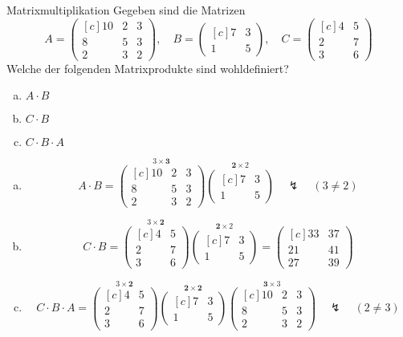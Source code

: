 \documentclass[german]{../spicker}
\newcommand{\vektor}[1]{\begin{pmatrix*}[c] #1 \end{pmatrix*}}
\begin{document}
\begin{example}{Matrixmultiplikation}
    Gegeben sind die Matrizen
    $$
        A = \vektor{10 & 2 & 3 \\ 8 & 5 & 3 \\ 2 & 3 & 2}, \quad
        B = \vektor{7 & 3 \\ 1 & 5}, \quad
        C = \vektor{4 & 5 \\ 2 & 7 \\ 3 & 6}
    $$
    Welche der folgenden Matrixprodukte sind wohldefiniert?

    \begin{enumerate}[a)]
        \item $A\cdot B$
        \item $C\cdot B$
        \item $C\cdot B \cdot A$
    \end{enumerate}

    \exampleseparator

    \begin{enumerate}[a)]
        \item $$
                  A\cdot B = \overset{3\times \pmb{3}}{\vektor{10 & 2 & 3 \\ 8 & 5 & 3 \\ 2 & 3 & 2}} \overset{\pmb{2}\times 2}{\vektor{7 & 3 \\ 1 & 5}} \quad \lightning \quad (3 \neq 2)
              $$
        \item $$
                  C\cdot B = \overset{3\times \pmb{2}}{\vektor{4 & 5 \\ 2 & 7 \\ 3 & 6}} \overset{\pmb{2}\times 2}{\vektor{7 & 3 \\ 1 & 5}} = \vektor{33 & 37 \\ 21 & 41 \\ 27 & 39}
              $$
        \item $$
                  C\cdot B \cdot A = \overset{3\times \pmb{2}}{\vektor{4 & 5 \\ 2 & 7 \\ 3 & 6}} \overset{\pmb{2}\times \pmb{2}}{\vektor{7 & 3 \\ 1 & 5}} \overset{\pmb{3}\times 3}{\vektor{10 & 2 & 3 \\ 8 & 5 & 3 \\ 2 & 3 & 2}} \quad \lightning \quad (2 \neq 3)
              $$
    \end{enumerate}
\end{example}
\end{document}
